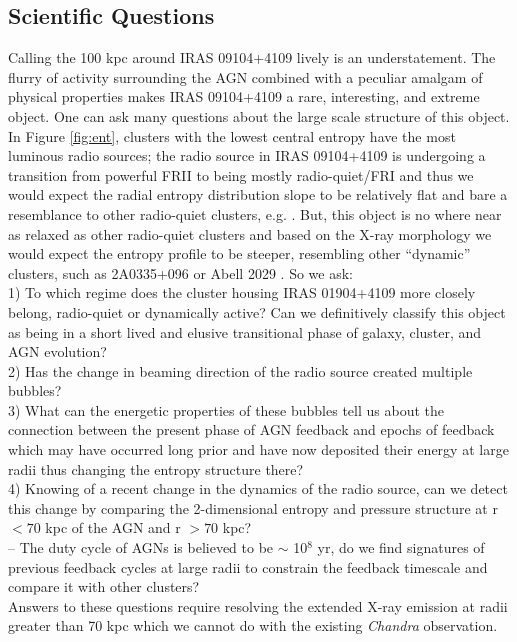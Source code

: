 \documentclass[letterpaper,11pt,twocolumn]{article}
\begin{document}
\subsection{Scientific Questions}
Calling the 100 kpc around IRAS 09104+4109 lively is an
understatement. The flurry of activity surrounding the AGN combined
with a peculiar amalgam of physical properties makes IRAS 09104+4109 a
rare, interesting, and extreme object. One can ask many questions about the
large scale structure of this object. In Figure \ref{fig:ent},
clusters with the lowest central
entropy have the most luminous radio sources; the radio source in IRAS
09104+4109 is undergoing a transition from powerful FRII to being mostly radio-quiet/FRI and
thus we would expect the radial entropy distribution slope to be relatively flat and
bare a resemblance to other radio-quiet clusters,
e.g. \cite{2005ApJ...630L..13D}. But, this object is no where near as
relaxed as other radio-quiet clusters and based on the X-ray
morphology we would expect the entropy profile to be steeper,
resembling other ``dynamic'' clusters, such as 2A0335+096 or Abell
2029 \cite{2006ApJ...643..730D}. So we ask:\\
1) To which regime does the cluster housing IRAS 01904+4109 more closely belong,
radio-quiet or dynamically active? Can we definitively classify this
object as being in a short lived and elusive transitional phase of
galaxy, cluster, and AGN evolution?\\
2) Has the change in beaming direction of the radio source created
multiple bubbles?\\
3) What can the energetic properties of these bubbles
tell us about the connection between the present phase of AGN feedback
and epochs of feedback which may have occurred long prior and have now
deposited their energy at large radii thus changing the entropy
structure there?\\
4) Knowing of a recent change in the dynamics of the radio source, can we
detect this change by comparing the 2-dimensional entropy and pressure structure at
r $< 70$ kpc of the AGN and r $> 70$ kpc?\\
-- The duty cycle of AGNs is believed to be $\sim$ 10$^8$ yr, do we
find signatures of previous feedback cycles at large radii to
constrain the feedback timescale and compare it with other clusters?\\
Answers to these questions require resolving the extended X-ray
emission at radii greater than 70 kpc which we cannot do with the
existing {\textit{Chandra}} observation.
\end{document}
